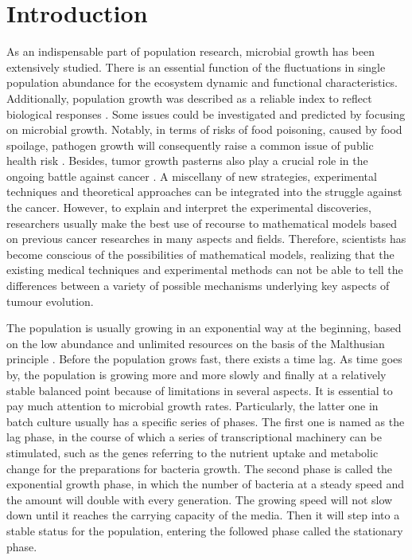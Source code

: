 \documentclass[11pt]{article}
\begin{document}
\section{Introduction}  
As an indispensable part of population research, microbial growth has been extensively studied. There is an essential function of the fluctuations in single population abundance for the ecosystem dynamic and functional characteristics. Additionally, population growth was described as a reliable index to reflect biological responses \citep{R7}. Some issues could be investigated and predicted by focusing on microbial growth. Notably, in terms of risks of food poisoning, caused by food spoilage, pathogen growth will consequently raise a common issue of public health risk \citep{R6}. Besides, tumor growth pasterns also play a crucial role in the ongoing battle against cancer \citep{R1, R2}. A miscellany of new strategies, experimental techniques and theoretical approaches can be integrated into the struggle against the cancer. However, to explain and interpret the experimental discoveries, researchers usually make the best use of recourse to mathematical models based on previous cancer researches in many aspects and fields. Therefore, scientists has become conscious  of the possibilities of mathematical models, realizing that the existing medical techniques and experimental methods can not be able to tell the differences between a variety of possible mechanisms underlying key aspects of tumour evolution\citep{R2}.

The population is usually growing in an exponential way at the beginning, based on the low abundance and unlimited resources on the basis of the Malthusian principle \citep{R9}. Before the population grows fast, there exists a time lag. As time goes by, the population is growing more and more slowly and finally at a relatively stable balanced point because of limitations in several aspects. It is essential to pay much attention to microbial growth rates. Particularly, the latter one in batch culture usually has a specific series of phases. The first one is named as the lag phase, in the course of which a series of transcriptional machinery can be stimulated, such as the genes referring to the nutrient uptake and metabolic change for the preparations for bacteria growth. The second phase is called the exponential growth phase, in which the number of bacteria at a steady speed and the amount will double with every generation. The growing speed will not slow down until it reaches the carrying capacity of the media. Then it will step into a stable status for the population, entering the followed phase called the stationary phase.  
\end{document}
